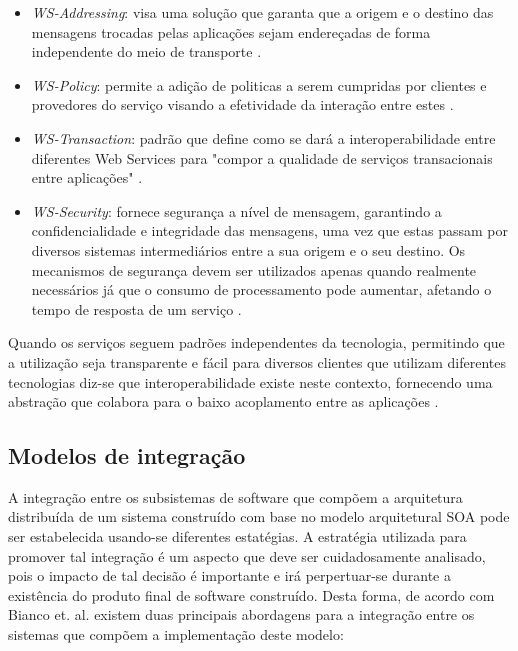 \begin{itemize}
\item \textit{WS-Addressing}: visa uma solução que garanta que a origem e o destino das mensagens trocadas pelas aplicações sejam endereçadas de forma independente do meio de transporte \cite{oliveira_interoperabilidade}.
\item \textit{WS-Policy}: permite a adição de politicas a serem cumpridas por clientes e provedores do serviço visando a efetividade da interação entre estes \cite{oliveira_interoperabilidade}.
\item \textit{WS-Transaction}: padrão que define como se dará a interoperabilidade entre diferentes Web Services para "compor a qualidade de serviços transacionais entre aplicações" \cite{oliveira_interoperabilidade}.
\item \textit{WS-Security}: fornece segurança a nível de mensagem, garantindo a confidencialidade e integridade das mensagens, uma vez que estas passam por diversos sistemas intermediários entre a sua origem e o seu destino. Os mecanismos de segurança devem ser utilizados apenas quando realmente necessários já que o consumo de processamento pode aumentar, afetando o tempo de resposta de um serviço \cite{oliveira_interoperabilidade}.
\end{itemize}

Quando os serviços seguem padrões independentes da tecnologia, permitindo que a utilização seja transparente e fácil para diversos clientes que utilizam diferentes tecnologias diz-se que interoperabilidade existe neste contexto, fornecendo uma abstração que colabora para o baixo acoplamento entre as aplicações \cite{oliveira_interoperabilidade}.

\subsection{Modelos de integração}
A integração entre os subsistemas de software que compõem a arquitetura distribuída de um sistema construído com base no modelo arquitetural SOA pode ser estabelecida usando-se diferentes estatégias. A estratégia utilizada para promover tal integração é um aspecto que deve ser cuidadosamente analisado, pois o impacto de tal decisão é importante e irá perpertuar-se durante a existência do produto final de software construído. Desta forma, de acordo com Bianco et. al. \cite{Bianco2007} existem duas principais abordagens para a integração entre os sistemas que compõem a implementação deste modelo:

